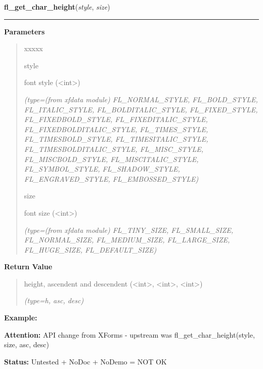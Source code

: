 \hspace{.8\funcindent}\begin{boxedminipage}{\funcwidth}

    \raggedright \textbf{fl\_get\_char\_height}(\textit{style}, \textit{size})

    \vspace{-1.5ex}

    \rule{\textwidth}{0.5\fboxrule}
\setlength{\parskip}{2ex}
\setlength{\parskip}{1ex}
      \textbf{Parameters}
      \vspace{-1ex}

      \begin{quote}
        \begin{Ventry}{xxxxx}

          \item[style]

          font style ({\textless}int{\textgreater})

            {\it (type=(from xfdata module) FL\_NORMAL\_STYLE, FL\_BOLD\_STYLE, FL\_ITALIC\_STYLE,
FL\_BOLDITALIC\_STYLE, FL\_FIXED\_STYLE, FL\_FIXEDBOLD\_STYLE, 
FL\_FIXEDITALIC\_STYLE, FL\_FIXEDBOLDITALIC\_STYLE, FL\_TIMES\_STYLE, 
FL\_TIMESBOLD\_STYLE, FL\_TIMESITALIC\_STYLE, FL\_TIMESBOLDITALIC\_STYLE, 
FL\_MISC\_STYLE, FL\_MISCBOLD\_STYLE, FL\_MISCITALIC\_STYLE, 
FL\_SYMBOL\_STYLE, FL\_SHADOW\_STYLE, FL\_ENGRAVED\_STYLE, 
FL\_EMBOSSED\_STYLE)}

          \item[size]

          font size ({\textless}int{\textgreater})

            {\it (type=(from xfdata module) FL\_TINY\_SIZE, FL\_SMALL\_SIZE, FL\_NORMAL\_SIZE, 
FL\_MEDIUM\_SIZE, FL\_LARGE\_SIZE, FL\_HUGE\_SIZE, FL\_DEFAULT\_SIZE)}

        \end{Ventry}

      \end{quote}

      \textbf{Return Value}
    \vspace{-1ex}

      \begin{quote}
      height, ascendent and descendent ({\textless}int{\textgreater}, 
      {\textless}int{\textgreater}, {\textless}int{\textgreater})

      {\it (type=h, asc, desc)}

      \end{quote}

\textbf{Example:} 

\textbf{Attention:} API change from XForms - upstream was fl\_get\_char\_height(style, size, 
asc, desc)



\textbf{Status:} Untested + NoDoc + NoDemo = NOT OK



    \end{boxedminipage}

